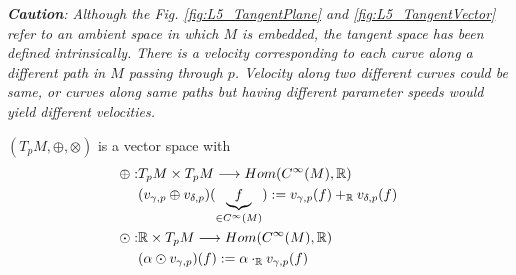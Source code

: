 \textit{\textbf{Caution}: Although the Fig. \ref{fig:L5_TangentPlane} and \ref{fig:L5_TangentVector} refer to an ambient space in which $M$ is embedded, the tangent space has been defined intrinsically. There is a velocity corresponding to each curve along a different path in $M$ passing through $p$. Velocity along two different curves could be same, or curves along same paths but having different parameter speeds would yield different velocities.}

\begin{theorem}
$(T_pM, \oplus, \otimes)$ is a vector space with 
\begin{align*}
  \oplus : & T_pM \times T_pM \longrightarrow Hom(C^\infty(M),\mathbb{R})  \\
  & (v_{\gamma,p} \oplus v_{\delta,p})(\underbrace{f}_{ \in C^{\infty}(M)} ) := v_{\gamma,p}(f) +_{\mathbb{R}} v_{\delta,p}(f) \\
  \odot : & \mathbb{R} \times T_pM \longrightarrow Hom(C^{\infty}(M),\mathbb{R}) \\
  & (\alpha \odot v_{\gamma,p} )(f) := \alpha \cdot_{\mathbb{R}}  v_{\gamma, p}(f)
\end{align*}
\end{theorem}

